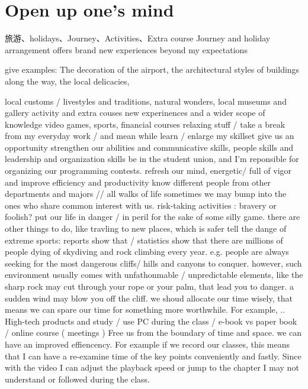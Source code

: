 \documentclass{ctexart}
\begin{document}
\section{Open up one's mind}
\begin{outline}
    \1 旅游、holidays、Journey、Activities、Extra course
    \1 Journey and holiday arrangement
        \2  offers brand new experiences beyond my expectations

            give examples: The decoration of the airport, the architectural styles of buildings along the way, the local delicacies,
 
            local customs / livestyles and traditions, natural wonders, local museums and gallery
    \1 activity and extra couses
        \2 new experinences and a wider scope of knowledge
            \3 video games, sports, financial courses
            \3 relaxing stuff / take a break from my everyday work / and mean while learn / enlarge my skillset
        \2 give us an opportunity strengthen our abilities and communicative skills, people skills and leadership and organization skills
            \3 be in the student union, and I'm reponsible for organizing our programming contests.
        \2 refresh our mind, energetic/ full of vigor and improve efficiency and productivity
        \2 know different people from other departments and majors // all walks of life
            \3 sometimes we may bump into the ones who share common interest with us.
    \1 risk-taking activities : bravery or foolish?
        \2 put our life in danger / in peril for the sake of some silly game.   
            \3 there are other things to do, like travling to new places, which is safer 
            \3 tell the dange of extreme sports: reports show that / statistics show that there are millions of people dying of skydiving and rock climbing every year. e.g. people are always seeking for the most dangerous cliffs/ hills and canyons to conquer. however, such environment usually comes with unfathonmable / unpredictable elements, like the sharp rock may cut through your rope or your palm, that lead you to danger. a sudden wind may blow you off the cliff.
            \3 we shoud allocate our time wisely, that means we can spare our time for something more worthwhile. For example, ..
    \1 High-tech products and study / use PC during the class / e-book vs paper book / online course ( meetings )
        \2 Free us from the boundary of time and space.
        \2 we can have an improved effiencency. For example if we record our classes, this means that I can have a re-examine time of the key points conveniently and fastly. Since with the video I can adjust the playback speed or jump to the chapter I may not understand or followed during the class. 

\end{outline}
\end{document}
